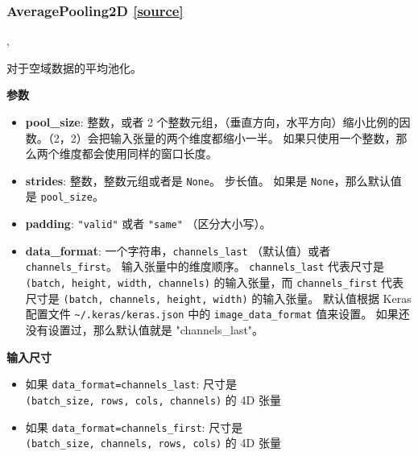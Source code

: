 \subsubsection{AveragePooling2D {\href{https://github.com/keras-team/keras/blob/master/keras/layers/pooling.py\#L225}{{[}source{]}}}}

\begin{Shaded}
\begin{Highlighting}[]
\OperatorTok{=}\NormalTok{(}\NormalTok{, }\OperatorTok{=}\OperatorTok{=},\\
\hspace{4cm}\OperatorTok{=}\NormalTok{)}
\end{Highlighting}
\end{Shaded}

对于空域数据的平均池化。

\textbf{参数}

\begin{itemize}
\tightlist
\item
  \textbf{pool\_size}: 整数，或者 2
  个整数元组，（垂直方向，水平方向）缩小比例的因数。（2，2）会把输入张量的两个维度都缩小一半。
  如果只使用一个整数，那么两个维度都会使用同样的窗口长度。
\item
  \textbf{strides}: 整数，整数元组或者是 \texttt{None}。 步长值。 如果是
  \texttt{None}，那么默认值是 \texttt{pool\_size}。
\item
  \textbf{padding}: \texttt{"valid"} 或者 \texttt{"same"}
  （区分大小写）。
\item
  \textbf{data\_format}: 一个字符串，\texttt{channels\_last}
  （默认值）或者 \texttt{channels\_first}。 输入张量中的维度顺序。
  \texttt{channels\_last} 代表尺寸是
  \texttt{(batch,\ height,\ width,\ channels)} 的输入张量，而
  \texttt{channels\_first} 代表尺寸是
  \texttt{(batch,\ channels,\ height,\ width)} 的输入张量。 默认值根据
  Keras 配置文件 \texttt{\textasciitilde{}/.keras/keras.json} 中的
  \texttt{image\_data\_format} 值来设置。
  如果还没有设置过，那么默认值就是 "channels\_last"。
\end{itemize}

\textbf{输入尺寸}

\begin{itemize}
\tightlist
\item
  如果
  \texttt{data\_format=\textquotesingle{}channels\_last\textquotesingle{}}:
  尺寸是 \texttt{(batch\_size,\ rows,\ cols,\ channels)} 的 4D 张量
\item
  如果
  \texttt{data\_format=\textquotesingle{}channels\_first\textquotesingle{}}:
  尺寸是 \texttt{(batch\_size,\ channels,\ rows,\ cols)} 的 4D 张量
\end{itemize}

